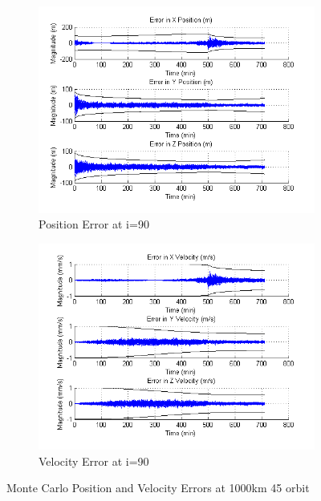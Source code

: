 \documentclass[]{aiaa-tc}%
\begin{document}
\begin{figure}[ht!]
\centering
\begin{subfigure}{.5\textwidth}
  \centering
  \includegraphics[width=0.9\linewidth]{MC_pos45}
  \caption{Position Error at i=90\degree}
  \label{fig:mcpos45}
\end{subfigure}%
\begin{subfigure}{.5\textwidth} 
  \centering
  \includegraphics[width=0.9\linewidth]{MC_vel45}
  \caption{Velocity Error at i=90\degree}
  \label{fig:coastline}
\end{subfigure}
\caption{Monte Carlo Position and Velocity Errors at 1000km 45 \degree orbit}
\label{fig:mcvel45}
\end{figure}
%
\end{document}
